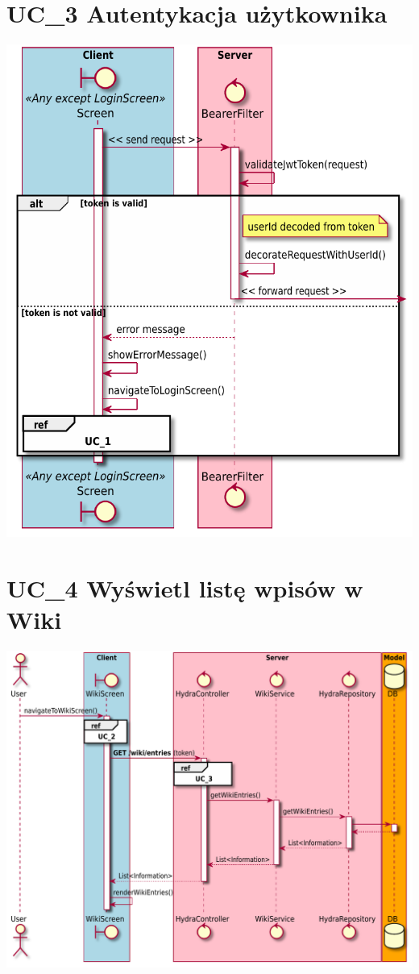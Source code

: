 \documentclass{scrreprt}
\begin{document}
\section{UC\_3 Autentykacja użytkownika}
\includegraphics[width=\textwidth, keepaspectratio]{graphics/sequence_diagram_user_auth.pdf}

\section{UC\_4 Wyświetl listę wpisów w Wiki}
\includegraphics[width=\textwidth, keepaspectratio]{graphics/sequence_diagram_wiki_list.pdf}
\end{document}
